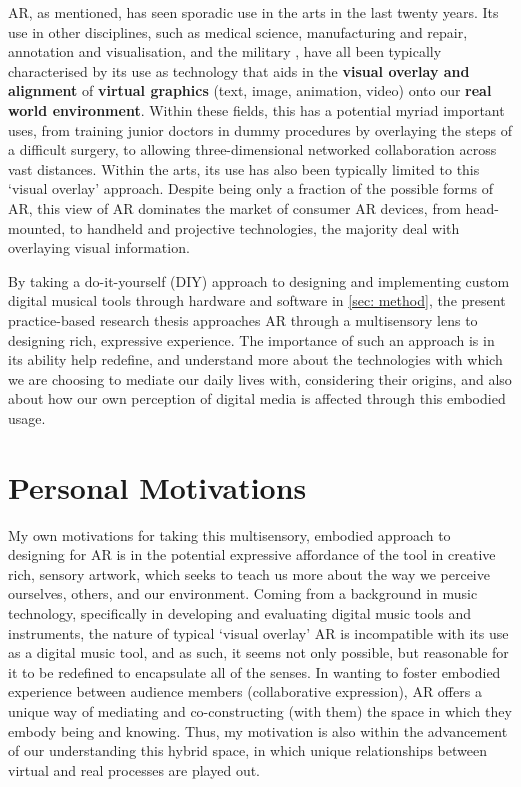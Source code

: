 AR, as mentioned, has seen sporadic use in the arts in the last twenty years. Its use in other disciplines, such as medical science, manufacturing and repair, annotation and visualisation, and the military \citep{azuma1997}, have all been typically characterised by its use as technology that aids in the \textbf{visual overlay and alignment} of \textbf{virtual graphics} (text, image, animation, video) onto our \textbf{real world environment}. Within these fields, this has a potential myriad important uses, from training junior doctors in dummy procedures by overlaying the steps of a difficult surgery, to allowing three-dimensional networked collaboration across vast distances. Within the arts, its use has also been typically limited to this `visual overlay' approach. Despite being only a fraction of the possible forms of AR, this view of AR dominates the market of consumer AR devices, from head-mounted, to handheld and projective technologies, the majority deal with overlaying visual information.  

By taking a do-it-yourself (DIY) approach to designing and implementing custom digital musical tools through hardware and software in \autoref{sec: method}, the present practice-based research thesis approaches AR through a multisensory lens to designing rich, expressive experience. The importance of such an approach is in its ability help redefine, and understand more about the technologies with which we are choosing to mediate our daily lives with, considering their origins, and also about how our own perception of digital media is affected through this embodied usage. 



\section{Personal Motivations}\label{sec: introduction-motivations}
My own motivations for taking this multisensory, embodied approach to designing for AR is in the potential expressive affordance of the tool in creative rich, sensory artwork, which seeks to teach us more about the way we perceive ourselves, others, and our environment. Coming from a background in music technology, specifically in developing and evaluating digital music tools and instruments, the nature of typical `visual overlay' AR is incompatible with its use as a digital music tool, and as such, it seems not only possible, but reasonable for it to be redefined to encapsulate all of the senses. In wanting to foster embodied experience between audience members (collaborative expression), AR offers a unique way of mediating and co-constructing (with them) the space in which they embody being and knowing. Thus, my motivation is also within the advancement of our understanding this hybrid space, in which unique relationships between virtual and real processes are played out.



